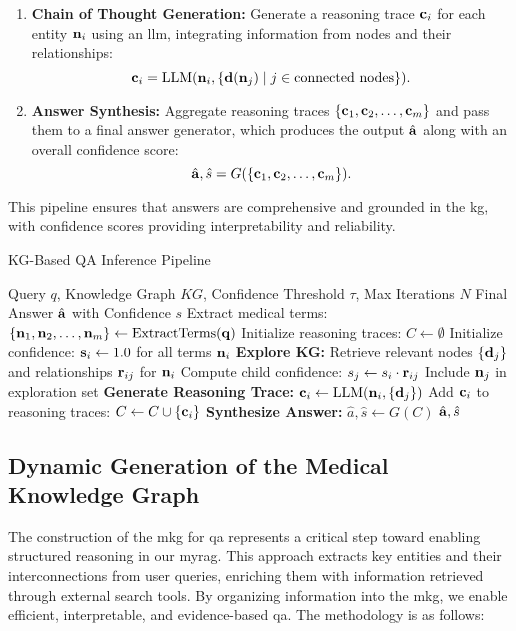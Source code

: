 \begin{enumerate}
    \item \textbf{Chain of Thought Generation:} Generate a reasoning trace ${\mathbf{c}}_i$ for each entity ${\mathbf{n}}_i$ using an \gls{llm}, integrating information from nodes and their relationships:
    \[
    {\mathbf{c}}_i = \text{LLM}({\mathbf{n}}_i, \{{\mathbf{d}}({\mathbf{n}}_j) \mid j \in \text{connected nodes}\}).
    \]

    \item \textbf{Answer Synthesis:} Aggregate reasoning traces $\{{\mathbf{c}}_1, {\mathbf{c}}_2, \ldots, {\mathbf{c}}_m\}$ and pass them to a final answer generator, which produces the output $\hat{{\mathbf{a}}}$ along with an overall confidence score:
    \[
    \hat{{\mathbf{a}}}, \hat{s} = G(\{{\mathbf{c}}_1, {\mathbf{c}}_2, \ldots, {\mathbf{c}}_m\}).
    \]
\end{enumerate}

This pipeline ensures that answers are comprehensive and grounded in the \gls{kg}, with confidence scores providing interpretability and reliability.

\begin{algorithm}
\small
\caption{KG-Based QA Inference Pipeline}
\begin{algorithmic}[1]
\Require Query $q$, Knowledge Graph $KG$, Confidence Threshold $\tau$, Max Iterations $N$
\Ensure Final Answer $\hat{{\mathbf{a}}}$ with Confidence $s$
\State Extract medical terms: $\{{\mathbf{n}}_1, {\mathbf{n}}_2, \ldots, {\mathbf{n}}_m\} \gets \text{ExtractTerms}({\mathbf{q}})$
\State Initialize reasoning traces: $C \gets \emptyset$
\State Initialize confidence: ${\mathbf{s}}_i \gets 1.0$ for all terms ${\mathbf{n}}_i$
 
    \State \textbf{Explore KG:} Retrieve relevant nodes $\{{\mathbf{d}}_j\}$ and relationships ${\mathbf{r}}_{ij}$ for ${\mathbf{n}}_i$
        \State Compute child confidence: $s_j \gets s_i \cdot {\mathbf{r}}_{ij}$
            \State Include ${\mathbf{n}}_j$ in exploration set
        \EndIf
    \EndFor
    \State \textbf{Generate Reasoning Trace:} ${\mathbf{c}}_i \gets \text{LLM}({\mathbf{n}}_i, \{{\mathbf{d}}_j\})$
    \State Add ${\mathbf{c}}_i$ to reasoning traces: $C \gets C \cup \{{\mathbf{c}}_i\}$
\EndFor
\State \textbf{Synthesize Answer:} $\hat{a}, \hat{s} \gets G(C)$
\State \Return $\hat{{\mathbf{a}}}, \hat{s}$ 
\end{algorithmic}
\label{alg:kg-qa-pipeline}
\end{algorithm}

\subsection{Dynamic Generation of the Medical Knowledge Graph}
The construction of the \gls{mkg} for \gls{qa} represents a critical step toward enabling structured reasoning in our \gls{myrag}. This approach extracts key entities and their interconnections from user queries, enriching them with information retrieved through external search tools. By organizing information into the \gls{mkg}, we enable efficient, interpretable, and evidence-based \gls{qa}. The methodology is as follows:

